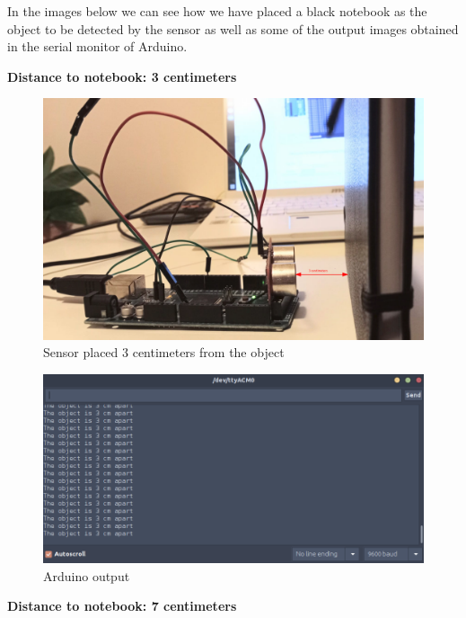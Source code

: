 In the images below we can see how we have placed a black notebook as the object to be detected by the sensor as well as some of the output images obtained in the serial monitor of Arduino.

\newpage
\textbf{Distance to notebook: 3 centimeters}

\begin{figure}[H]
    \centering
    \includegraphics[width=1\textwidth]{fig/ultrasonic3cm.png}
    \caption{Sensor placed 3 centimeters from the object}
    \label{fig:ultrasonic3cm}
\end{figure}

\begin{figure}[H]
    \centering
    \includegraphics[width=1\textwidth]{fig/arduino3cm.png}
    \caption{Arduino output}
    \label{fig:arduino3cm}
\end{figure}

\vspace{5mm}
\textbf{Distance to notebook: 7 centimeters}

